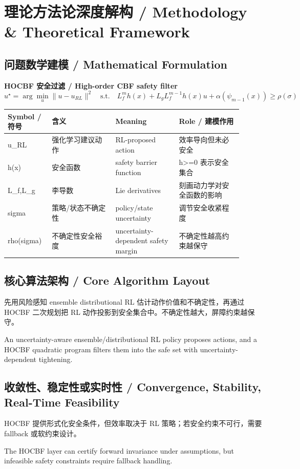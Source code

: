 \documentclass[UTF8,a4paper,11pt,fontset=fandol]{ctexart}
\begin{document}
\section{理论方法论深度解构 / Methodology \& Theoretical Framework}
\subsection{问题数学建模 / Mathematical Formulation}
\textbf{HOCBF 安全过滤 / High-order CBF safety filter}
\[
u^\star=\arg\min_u \|u-u_{RL}\|^2\quad \text{s.t.}\quad L_f^m h(x)+L_gL_f^{m-1}h(x)u+\alpha(\psi_{m-1}(x))\ge \rho(\sigma)
\]
\begin{longtable}{p{0.16\linewidth}p{0.25\linewidth}p{0.25\linewidth}p{0.25\linewidth}}
\toprule
Symbol / 符号 & 含义 & Meaning & Role / 建模作用\\
\midrule
u\_RL & 强化学习建议动作 & RL-proposed action & 效率导向但未必安全 \\
h(x) & 安全函数 & safety barrier function & h>=0 表示安全集合 \\
L\_f,L\_g & 李导数 & Lie derivatives & 刻画动力学对安全函数的影响 \\
sigma & 策略/状态不确定性 & policy/state uncertainty & 调节安全收紧程度 \\
rho(sigma) & 不确定性安全裕度 & uncertainty-dependent safety margin & 不确定性越高约束越保守 \\
\bottomrule
\end{longtable}

\subsection{核心算法架构 / Core Algorithm Layout}
先用风险感知 ensemble distributional RL 估计动作价值和不确定性，再通过 HOCBF 二次规划把 RL 动作投影到安全集合中。不确定性越大，屏障约束越保守。

An uncertainty-aware ensemble/distributional RL policy proposes actions, and a HOCBF quadratic program filters them into the safe set with uncertainty-dependent tightening.

\subsection{收敛性、稳定性或实时性 / Convergence, Stability, Real-Time Feasibility}
HOCBF 提供形式化安全条件，但效率取决于 RL 策略；若安全约束不可行，需要 fallback 或软约束设计。

The HOCBF layer can certify forward invariance under assumptions, but infeasible safety constraints require fallback handling.
\end{document}
